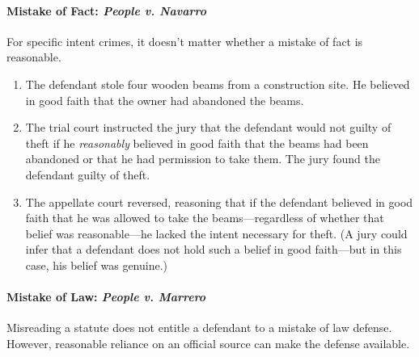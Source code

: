 \paragraph{Mistake of Fact: \emph{People v. Navarro}}

For specific intent crimes, it doesn't matter whether a mistake of fact is 
reasonable.

\begin{enumerate}
    \item The defendant stole four wooden beams from a construction site. He 
    believed in good faith that the owner had abandoned the beams.
    \item The trial court instructed the jury that the defendant would not 
    guilty of theft if he \emph{reasonably} believed in good faith that the 
    beams had been abandoned or that he had permission to take them. The jury 
    found the defendant guilty of theft.
    \item The appellate court reversed, reasoning that if the defendant 
    believed in good faith that he was allowed to take the beams---regardless 
    of whether that belief was reasonable---he lacked the intent necessary for 
    theft. (A jury could infer that a defendant does not hold such a belief in 
    good faith---but in this case, his belief was genuine.)
\end{enumerate}

\paragraph{Mistake of Law: \emph{People v. Marrero}}

Misreading a statute does not entitle a defendant to a mistake of law defense. 
However, reasonable reliance on an official source can make the defense 
available.

